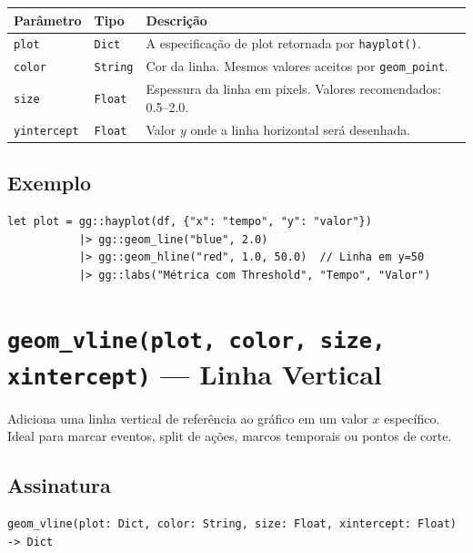 \documentclass[12pt, a4paper, oneside]{book}
\newcommand{\code}[1]{\texttt{#1}}
\begin{document}
\begin{tabularx}{\textwidth}{@{}lL{2.5cm}X@{}}
  \toprule
  \textbf{Parâmetro} & \textbf{Tipo} & \textbf{Descrição} \\
  \midrule
  \code{plot}       & \code{Dict}   & A especificação de plot retornada por \code{hayplot()}. \\[4pt]
  \code{color}      & \code{String} & Cor da linha. Mesmos valores aceitos por \code{geom\_point}. \\[4pt]
  \code{size}       & \code{Float}  & Espessura da linha em pixels. Valores recomendados: 0.5--2.0. \\[4pt]
  \code{yintercept} & \code{Float}  & Valor $y$ onde a linha horizontal será desenhada. \\
  \bottomrule
\end{tabularx}

\subsection*{Exemplo}

\begin{lstlisting}[caption={Linha horizontal de referência}]
let plot = gg::hayplot(df, {"x": "tempo", "y": "valor"})
           |> gg::geom_line("blue", 2.0)
           |> gg::geom_hline("red", 1.0, 50.0)  // Linha em y=50
           |> gg::labs("Métrica com Threshold", "Tempo", "Valor")
\end{lstlisting}

\section{\texttt{geom\_vline(plot, color, size, xintercept)} --- Linha Vertical}

Adiciona uma linha vertical de referência ao gráfico em um valor $x$ específico.
Ideal para marcar eventos, split de ações, marcos temporais ou pontos de corte.

\subsection*{Assinatura}

\begin{lstlisting}[style=inline]
geom_vline(plot: Dict, color: String, size: Float, xintercept: Float) -> Dict
\end{lstlisting}
\end{document}

